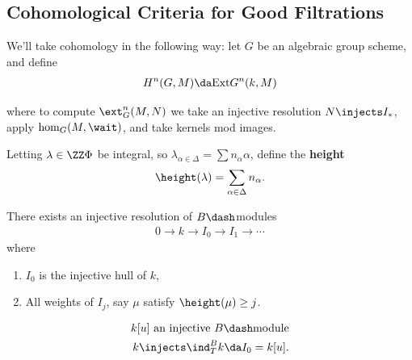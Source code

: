 \begin{center}
\end{center}

\hypertarget{cohomological-criteria-for-good-filtrations}{%
\subsection{Cohomological Criteria for Good
Filtrations}\label{cohomological-criteria-for-good-filtrations}}

We'll take cohomology in the following way: let \(G\) be an algebraic
group scheme, and define
\begin{align*}  
H^n(G, M) \da 
\mathrm{Ext} G^n(k, M)
\end{align*}

where to compute \(\ext_G^n(M, N)\) we take an injective resolution
\(N \injects I_*\), apply \(\hom_G(M, \wait)\), and take kernels mod
images.

Letting \(\lambda \in \ZZ\Phi\) be integral, so
\(\lambda_{\alpha \in \Delta} = \sum n_\alpha \alpha\), define the
\textbf{height}
\begin{align*}  
\height(\lambda) = \sum_{\alpha\in\Delta} n_\alpha
.\end{align*}

\begin{lemma}[?]

There exists an injective resolution of \(B\dash\)modules
\begin{align*}  
0\to k\to I_0 \to I_1 \to \cdots
\end{align*} where

\begin{enumerate}
\def\labelenumi{\arabic{enumi}.}
\tightlist
\item
  \(I_0\) is the injective hull of \(k\),
\item
  All weights of \(I_j\), say \(\mu\) satisfy \(\height(\mu) \geq j\).
\end{enumerate}

\end{lemma}

\begin{align*}  
k[u] \text{ an injective $B\dash$module} \\
k\injects \ind_T^B k \da I_0 = k[u]
.\end{align*}


